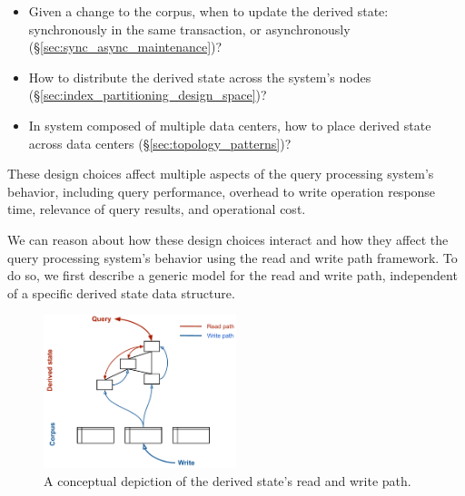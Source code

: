 \begin{itemize}

  \item Given a change to the corpus, when to update the derived state:
  synchronously in the same transaction, or asynchronously (\S\ref{sec:sync_async_maintenance})?

  \item How to distribute the derived state across the system's nodes (\S\ref{sec:index_partitioning_design_space})?

  \item In system composed of multiple data centers,
  how to place derived state across data centers (\S\ref{sec:topology_patterns})?


\end{itemize}

These design choices affect multiple aspects of the query processing system's behavior,
including query performance, overhead to write operation response time, relevance of query results, and operational cost.

We can reason about how these design choices interact and how they affect the query processing system's behavior
using the read and write path framework.
To do so, we first describe a generic model for the read and write path,
independent of a specific derived state data structure.

\begin{figure}[H]
  \centering
    \includegraphics[width=0.5\textwidth]{./figures/design_space/read_write_path.pdf}
  \caption{A conceptual depiction of the derived state's read and write path.}
  \label{fig:design_space_read_write_path}
\end{figure}

